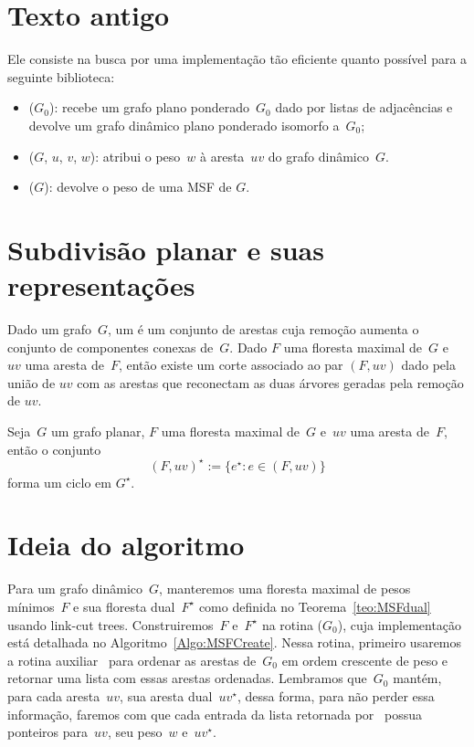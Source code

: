 \section{Texto antigo}

Ele consiste na busca por uma implementação tão eficiente quanto possível para a seguinte biblioteca:

\begin{itemize}
\item \MSFCreate($G_0$): recebe um grafo plano ponderado~$G_0$ dado por listas de adjacências e devolve um grafo dinâmico plano ponderado isomorfo a~$G_0$; 
\item \MSFupdate($G$, $u$, $v$, $w$): atribui o peso~$w$ à aresta~$uv$ do grafo dinâmico~$G$.
\item \MSFweight($G$): devolve o peso de uma MSF de $G$.
\end{itemize}


\section{Subdivisão planar e suas representações}


Dado um grafo~$G$, um  é um conjunto de arestas cuja remoção aumenta o conjunto de componentes conexas de~$G$.
Dado $F$ uma floresta maximal de~$G$ e~$uv$ uma aresta de~$F$, então existe um corte associado ao par $(F, uv)$ dado pela união de $uv$ com as arestas que reconectam as duas árvores geradas pela remoção de $uv$.


\begin{theorem}
\label{teo:cutset}
Seja~$G$ um grafo planar, $F$ uma floresta maximal de~$G$ e~$uv$ uma aresta de~$F$, então o conjunto
$$
(F, uv)^\star := \{e^\star:e\in (F, uv)\}
$$
forma um ciclo em $G^\star$.
\end{theorem}


\section{Ideia do algoritmo}
Para um grafo dinâmico~$G$, manteremos uma floresta maximal de pesos mínimos~$F$ e sua floresta dual~$F^\star$ como definida no Teorema~\ref{teo:MSFdual} usando link-cut trees.
Construiremos~$F$ e~$F^\star$ na rotina \MSFCreate($G_0$), cuja implementação está detalhada no Algoritmo~\ref{Algo:MSFCreate}.
Nessa rotina, primeiro usaremos a rotina auxiliar~\order{} para ordenar as arestas de~$G_0$ em ordem crescente de peso e retornar uma lista com essas arestas ordenadas.
Lembramos que~$G_0$ mantém, para cada aresta~$uv$, sua aresta dual~$uv^\star$, dessa forma, para não perder essa informação, faremos com que cada entrada da lista retornada por~\order{}
possua ponteiros para~$uv$, seu peso~$w$ e~$uv^\star$.

